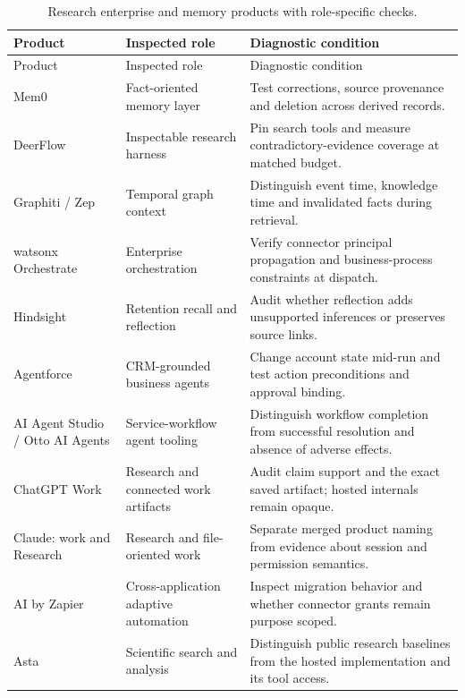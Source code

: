 \begingroup\setlength{\tabcolsep}{3pt}\small
\bookneedspace{.42\textheight}
\begin{longtable}{L{25mm}L{35mm}L{48mm}}
\caption{Research enterprise and memory products with role-specific checks.}\label{tab:C24:catalog}\\
\toprule Product & Inspected role & Diagnostic condition \\
\midrule\endfirsthead
\toprule Product & Inspected role & Diagnostic condition \\
\midrule\endhead
Mem0\cite{executionproduct024} & Fact-oriented memory layer & Test corrections, source provenance and deletion across derived records. \\
DeerFlow\cite{executionproduct029} & Inspectable research harness & Pin search tools and measure contradictory-evidence coverage at matched budget. \\
Graphiti / Zep\cite{executionproduct033} & Temporal graph context & Distinguish event time, knowledge time and invalidated facts during retrieval. \\
watsonx Orchestrate\cite{executionproduct034} & Enterprise orchestration & Verify connector principal propagation and business-process constraints at dispatch. \\
Hindsight\cite{executionproduct040} & Retention recall and reflection & Audit whether reflection adds unsupported inferences or preserves source links. \\
Agentforce\cite{executionproduct045} & CRM-grounded business agents & Change account state mid-run and test action preconditions and approval binding. \\
AI Agent Studio / Otto AI Agents\cite{executionproduct046} & Service-workflow agent tooling & Distinguish workflow completion from successful resolution and absence of adverse effects. \\
ChatGPT Work\cite{executionproduct047} & Research and connected work artifacts & Audit claim support and the exact saved artifact; hosted internals remain opaque. \\
Claude: work and Research\cite{executionproduct048} & Research and file-oriented work & Separate merged product naming from evidence about session and permission semantics. \\
AI by Zapier\cite{executionproduct053} & Cross-application adaptive automation & Inspect migration behavior and whether connector grants remain purpose scoped. \\
Asta\cite{executionproduct058} & Scientific search and analysis & Distinguish public research baselines from the hosted implementation and its tool access. \\

\end{longtable}
